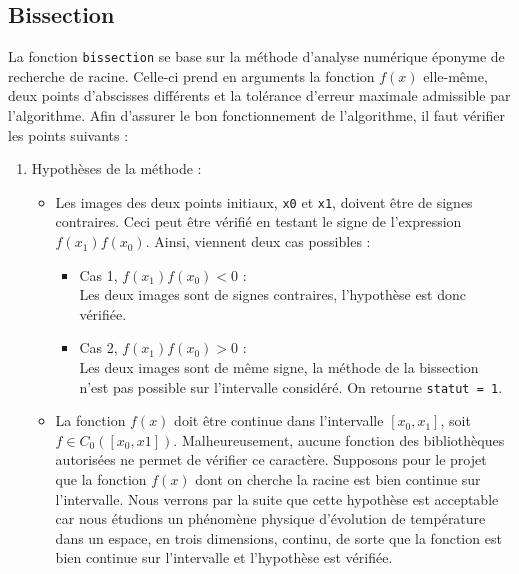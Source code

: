 \documentclass[12pt]{article}
\begin{document}
    \subsection{Bissection}
            La fonction \texttt{bissection} se base sur la méthode d'analyse numérique éponyme de recherche de racine. Celle-ci prend en arguments la fonction $f(x)$ elle-même, deux points d'abscisses différents et la tolérance d'erreur maximale admissible par l'algorithme. Afin d'assurer le bon fonctionnement de l'algorithme, il faut vérifier les points suivants :
            \begin{enumerate}[label=\roman*.]
            \item Hypothèses de la méthode : 
                \begin{itemize}
                    \item 
                        Les images des deux points initiaux, \texttt{x0} et \texttt{x1}, doivent être de signes contraires. Ceci peut être vérifié en testant le signe de l'expression $f(x_1)f(x_0)$. Ainsi, viennent deux cas possibles :
                        
                        \begin{itemize}
                            \item Cas 1, $f(x_1)f(x_0) < 0$ : \vspace{2mm} \\ 
                            Les deux images sont de signes contraires, l'hypothèse est donc vérifiée. \vspace{2mm} 
                            \item Cas 2, $f(x_1)f(x_0) > 0$ : \vspace{2mm} \\
                            Les deux images sont de même signe, la méthode de la bissection n'est pas possible sur l'intervalle considéré. On retourne \texttt{statut = 1}.
                        \end{itemize}
                    \item
                        La fonction $f(x)$ doit être continue dans l'intervalle $[x_0 , x_1]$, soit $f \in C_0([x_0,x1])$. Malheureusement, aucune fonction des bibliothèques autorisées ne permet de vérifier ce caractère. Supposons pour le projet que la fonction $f(x)$ dont on cherche la racine est bien continue sur l'intervalle. Nous verrons par la suite que cette hypothèse est acceptable car nous étudions un phénomène physique d'évolution de température dans un espace, en trois dimensions, continu, de sorte que la fonction est bien continue sur l'intervalle et l'hypothèse est vérifiée.
        

\end{itemize}
\end{enumerate}
\end{document}
